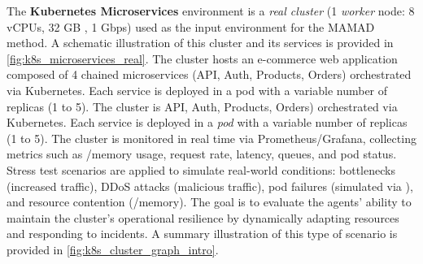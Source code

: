 {The \textbf{Kubernetes Microservices} environment is a \emph{real cluster} (1 \textit{worker} node: 8 vCPUs, 32 GB , 1 Gbps) used as the input environment for the MAMAD method. A schematic illustration of this cluster and its services is provided in \autoref{fig:k8s_microservices_real}. The cluster hosts an e-commerce web application composed of 4 chained microservices (API, Auth, Products, Orders) orchestrated via Kubernetes. Each service is deployed in a pod with a variable number of replicas (1 to 5). The cluster is {API}, Auth, Products, Orders) orchestrated via Kubernetes. Each service is deployed in a \emph{pod} with a variable number of replicas (1 to 5). The cluster is monitored in real time via Prometheus/Grafana, collecting metrics such as /memory usage, request rate, latency, queues, and pod status. Stress test scenarios are applied to simulate real-world conditions: bottlenecks (increased traffic), DDoS attacks (malicious traffic), pod failures (simulated via ), and resource contention (/memory). The goal is to evaluate the agents' ability to maintain the cluster's operational resilience by dynamically adapting resources and responding to incidents. A summary illustration of this type of scenario is provided in \autoref{fig:k8s_cluster_graph_intro}.

}
